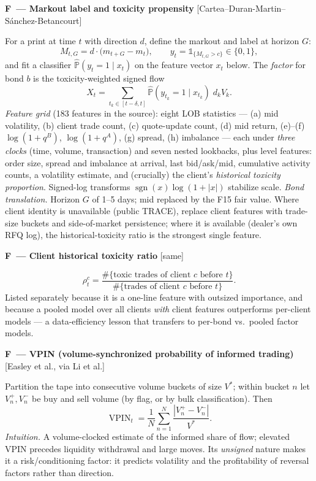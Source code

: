 \documentclass[11pt]{article}
\newcommand{\Prob}{\mathbb{P}}
\newcommand{\ind}[1]{\mathbb{1}_{\{#1\}}}
\newcommand{\sgn}{\operatorname{sgn}}
\newcounter{fac}
\newcommand{\factor}[2]{%
  \refstepcounter{fac}%
  \par\medskip\noindent\textbf{F\thefac\ --- #1} \hfill {\small[#2]}\par\nopagebreak}
\begin{document}
\factor{Markout label and toxicity propensity}{Cartea--Duran-Martin--S\'anchez-Betancourt}
For a print at time $t$ with direction $d$, define the markout and label at horizon $G$:
\[
M_{t,G} = d\cdot\big(m_{t+G} - m_t\big), \qquad y_t = \ind{M_{t,G} > c} \in \{0,1\},
\]
and fit a classifier $\widehat{\Prob}(y_t = 1 \mid x_t)$ on the feature vector $x_t$ below. The \emph{factor} for bond $b$ is the toxicity-weighted signed flow
\[
X_t = \sum_{t_k \in [t-\delta, t]} \widehat{\Prob}(y_{t_k}=1 \mid x_{t_k})\; d_k V_k .
\]
\emph{Feature grid} (183 features in the source): eight LOB statistics --- (a) mid volatility, (b) client trade count, (c) quote-update count, (d) mid return, (e)--(f) $\log(1+q^B)$, $\log(1+q^A)$, (g) spread, (h) imbalance --- each under \emph{three clocks} (time, volume, transaction) and seven nested lookbacks, plus level features: order size, spread and imbalance at arrival, last bid/ask/mid, cumulative activity counts, a volatility estimate, and (crucially) the client's \emph{historical toxicity proportion}. Signed-log transforms $\sgn(x)\log(1+|x|)$ stabilize scale.
\emph{Bond translation.} Horizon $G$ of 1--5 days; mid replaced by the F15 fair value. Where client identity is unavailable (public TRACE), replace client features with trade-size buckets and side-of-market persistence; where it is available (dealer's own RFQ log), the historical-toxicity ratio is the strongest single feature.

\factor{Client historical toxicity ratio}{same}
\[
\rho^c_t = \frac{\#\{\text{toxic trades of client } c \text{ before } t\}}{\#\{\text{trades of client } c \text{ before } t\}} .
\]
Listed separately because it is a one-line feature with outsized importance, and because a pooled model over all clients \emph{with} client features outperforms per-client models --- a data-efficiency lesson that transfers to per-bond vs.\ pooled factor models.

\factor{VPIN (volume-synchronized probability of informed trading)}{Easley et al., via Li et al.}
Partition the tape into consecutive volume buckets of size $V^\ast$; within bucket $n$ let $V^{+}_n, V^{-}_n$ be buy and sell volume (by flag, or by bulk classification). Then
\[
\operatorname{VPIN}_t = \frac{1}{N}\sum_{n=1}^{N} \frac{|V^{+}_n - V^{-}_n|}{V^\ast}.
\]
\emph{Intuition.} A volume-clocked estimate of the informed share of flow; elevated VPIN precedes liquidity withdrawal and large moves. Its \emph{unsigned} nature makes it a risk/conditioning factor: it predicts volatility and the profitability of reversal factors rather than direction.
\end{document}
